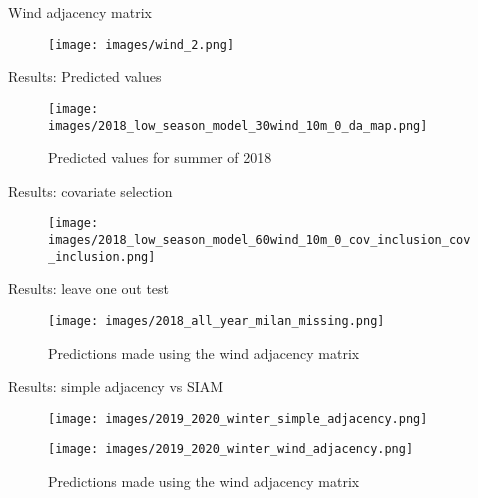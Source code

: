 \documentclass[10pt]{beamer}
\begin{document}
\begin{frame}{Wind adjacency matrix}
    \begin{figure}
        \texttt{[image: images/wind\_2.png]}
    \end{figure}
\end{frame}

\begin{frame}{Results: Predicted values}
    \begin{figure}
        \texttt{[image: images/2018\_low\_season\_model\_30wind\_10m\_0\_da\_map.png]}
        \caption{Predicted values for summer of 2018}
    \end{figure}
\end{frame}

\begin{frame}{Results: covariate selection}
    \begin{figure}
        \texttt{[image: images/2018\_low\_season\_model\_60wind\_10m\_0\_cov\_inclusion\_cov\_inclusion.png]}
        \caption{}
    \end{figure}
\end{frame}

\begin{frame}{Results: leave one out test}
    \begin{figure}
        \texttt{[image: images/2018\_all\_year\_milan\_missing.png]}
        \caption{Predictions made using the wind adjacency matrix}
    \end{figure}
\end{frame}

\begin{frame}{Results: simple adjacency vs SIAM}
    \begin{figure}
        \begin{minipage}{0.45\textwidth}
            \texttt{[image: images/2019\_2020\_winter\_simple\_adjacency.png]}
            \caption{Predictions made using just distance and adjacency information}
        \end{minipage}
        \hfill
        \begin{minipage}{0.45\textwidth}
            \texttt{[image: images/2019\_2020\_winter\_wind\_adjacency.png]}
            \caption{Predictions made using the wind adjacency matrix}
        \end{minipage}
    \end{figure}
\end{frame}
\end{document}
